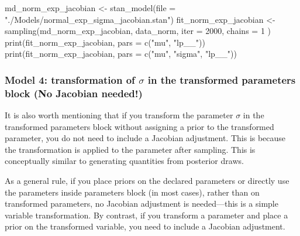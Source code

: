 \documentclass[
  letterpaper,
  DIV=11,
  numbers=noendperiod]{scrartcl}
\newenvironment{Shaded}{}{}
\newcommand{\AttributeTok}[1]{\textcolor[rgb]{0.65,0.15,0.64}{#1}}
\newcommand{\DecValTok}[1]{\textcolor[rgb]{0.60,0.41,0.00}{#1}}
\newcommand{\FunctionTok}[1]{\textcolor[rgb]{0.25,0.47,0.95}{#1}}
\newcommand{\NormalTok}[1]{\textcolor[rgb]{0.22,0.23,0.26}{#1}}
\newcommand{\OtherTok}[1]{\textcolor[rgb]{0.15,0.68,0.38}{#1}}
\newcommand{\StringTok}[1]{\textcolor[rgb]{0.31,0.63,0.31}{#1}}
\begin{document}
\begin{Shaded}
\begin{Highlighting}[]
\NormalTok{md\_norm\_exp\_jacobian }\OtherTok{\textless{}{-}} \FunctionTok{stan\_model}\NormalTok{(}\AttributeTok{file =} \StringTok{"./Models/normal\_exp\_sigma\_jacobian.stan"}\NormalTok{)}
\NormalTok{fit\_norm\_exp\_jacobian }\OtherTok{\textless{}{-}} \FunctionTok{sampling}\NormalTok{(md\_norm\_exp\_jacobian, data\_norm,}
  \AttributeTok{iter =} \DecValTok{2000}\NormalTok{, }\AttributeTok{chains =} \DecValTok{1}
\NormalTok{)}
\FunctionTok{print}\NormalTok{(fit\_norm\_exp\_jacobian, }\AttributeTok{pars =} \FunctionTok{c}\NormalTok{(}\StringTok{"mu"}\NormalTok{, }\StringTok{"lp\_\_"}\NormalTok{))}
\FunctionTok{print}\NormalTok{(fit\_norm\_exp\_jacobian, }\AttributeTok{pars =} \FunctionTok{c}\NormalTok{(}\StringTok{"mu"}\NormalTok{, }\StringTok{"sigma"}\NormalTok{, }\StringTok{"lp\_\_"}\NormalTok{))}
\end{Highlighting}
\end{Shaded}

\subsubsection{\texorpdfstring{Model 4: transformation of \(\sigma\) in
the transformed parameters block (No Jacobian
needed!)}{Model 4: transformation of \textbackslash sigma in the transformed parameters block (No Jacobian needed!)}}\label{model-4-transformation-of-sigma-in-the-transformed-parameters-block-no-jacobian-needed}

It is also worth mentioning that if you transform the parameter
\(\sigma\) in the transformed parameters block without assigning a prior
to the transformed parameter, you do not need to include a Jacobian
adjustment. This is because the transformation is applied to the
parameter after sampling. This is conceptually similar to generating
quantities from posterior draws.

As a general rule, if you place priors on the declared parameters or
directly use the parameters inside parameters block (in most cases),
rather than on transformed parameters, no Jacobian adjustment is
needed---this is a simple variable transformation. By contrast, if you
transform a parameter and place a prior on the transformed variable, you
need to include a Jacobian adjustment.
\end{document}
